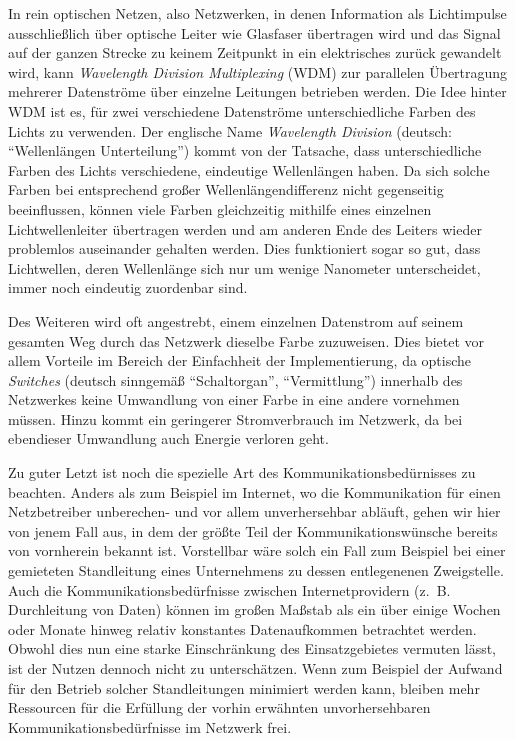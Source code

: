 In rein optischen Netzen, also Netzwerken, in denen Information als Lichtimpulse ausschließlich über optische Leiter wie Glasfaser übertragen wird und das Signal auf der ganzen Strecke zu keinem Zeitpunkt in ein elektrisches zurück gewandelt wird, kann \textit{Wavelength Division Multiplexing} (WDM) zur parallelen Übertragung mehrerer Datenströme über einzelne Leitungen betrieben werden. Die Idee hinter WDM ist es, für zwei verschiedene Datenströme unterschiedliche Farben des Lichts zu verwenden. Der englische Name \emph{Wavelength Division} (deutsch: \enquote{Wellenlängen Unterteilung}) kommt von der Tatsache, dass unterschiedliche Farben des Lichts verschiedene, eindeutige Wellenlängen haben. Da sich solche Farben bei entsprechend großer Wellenlängendifferenz nicht gegenseitig beeinflussen, können viele Farben gleichzeitig mithilfe eines einzelnen Lichtwellenleiter übertragen werden und am anderen Ende des Leiters wieder problemlos auseinander gehalten werden. Dies funktioniert sogar so gut, dass Lichtwellen, deren Wellenlänge sich nur um wenige Nanometer unterscheidet, immer noch eindeutig zuordenbar sind.

Des Weiteren wird oft angestrebt, einem einzelnen Datenstrom auf seinem gesamten Weg durch das Netzwerk dieselbe Farbe zuzuweisen. Dies bietet vor allem Vorteile  im Bereich der Einfachheit der Implementierung, da optische \emph{Switches} (deutsch sinngemäß \enquote{Schaltorgan}, \enquote{Vermittlung}) innerhalb des Netzwerkes keine Umwandlung von einer Farbe in eine andere vornehmen müssen. Hinzu kommt ein geringerer Stromverbrauch im Netzwerk, da bei ebendieser Umwandlung auch Energie verloren geht.

Zu guter Letzt ist noch die spezielle Art des Kommunikationsbedürnisses zu beachten. Anders als zum Beispiel im Internet, wo die Kommunikation für einen Netzbetreiber unberechen- und vor allem unverhersehbar abläuft, gehen wir hier von jenem Fall aus, in dem der größte Teil der Kommunikationswünsche bereits von vornherein bekannt ist. Vorstellbar wäre solch ein Fall zum Beispiel bei einer gemieteten Standleitung eines Unternehmens zu dessen entlegenenen Zweigstelle. Auch die Kommunikationsbedürfnisse zwischen Internetprovidern (z.\ B. Durchleitung von Daten) können im großen Maßstab als ein über einige Wochen oder Monate hinweg relativ konstantes Datenaufkommen betrachtet werden. Obwohl dies nun eine starke Einschränkung des Einsatzgebietes vermuten lässt, ist der Nutzen dennoch nicht zu unterschätzen. Wenn zum Beispiel der Aufwand für den Betrieb solcher Standleitungen minimiert werden kann, bleiben mehr Ressourcen für die Erfüllung der vorhin erwähnten unvorhersehbaren Kommunikationsbedürfnisse im Netzwerk frei.

